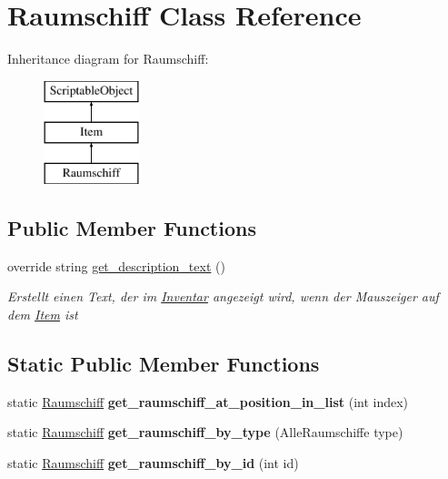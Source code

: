 \hypertarget{class_raumschiff}{}\section{Raumschiff Class Reference}
\label{class_raumschiff}
Inheritance diagram for Raumschiff\+:\begin{figure}[H]
\begin{center}
\leavevmode
\includegraphics[height=3.000000cm]{class_raumschiff}
\end{center}
\end{figure}
\subsection*{Public Member Functions}
\begin{DoxyCompactItemize}
\item 
override string \hyperlink{class_raumschiff_a9aa65a7d3deb846709b85be4d157d621}{get\+\_\+description\+\_\+text} ()
\begin{DoxyCompactList}\small\item\em Erstellt einen Text, der im \hyperlink{class_inventar}{Inventar} angezeigt wird, wenn der Mauszeiger auf dem \hyperlink{class_item}{Item} ist \end{DoxyCompactList}\end{DoxyCompactItemize}
\subsection*{Static Public Member Functions}
\begin{DoxyCompactItemize}
\item 
\mbox{\label{class_raumschiff_aa783459dc3b1d97c6138e1c0e98f6f0a}} 
static \hyperlink{class_raumschiff}{Raumschiff} {\bfseries get\+\_\+raumschiff\+\_\+at\+\_\+position\+\_\+in\+\_\+list} (int index)
\item 
\mbox{\label{class_raumschiff_aad5f13c6b5da4292cd82820dc41ccab4}} 
static \hyperlink{class_raumschiff}{Raumschiff} {\bfseries get\+\_\+raumschiff\+\_\+by\+\_\+type} (Alle\+Raumschiffe type)
\item 
\mbox{\label{class_raumschiff_a929e24addf9b7486f6386553a94ccedb}} 
static \hyperlink{class_raumschiff}{Raumschiff} {\bfseries get\+\_\+raumschiff\+\_\+by\+\_\+id} (int id)
\end{DoxyCompactItemize}
